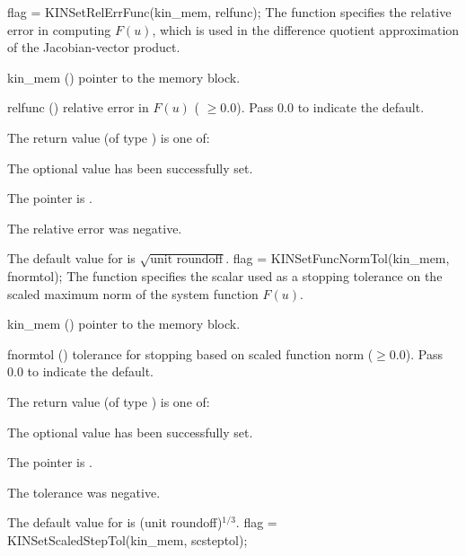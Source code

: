 {
flag = KINSetRelErrFunc(kin\_mem, relfunc);
}
{
  The function  specifies the relative error in 
  computing $F(u)$, which is used in the difference quotient approximation of the
  Jacobian-vector product.
}
{
  \begin{args}[relfunc]
  \item[kin\_mem] ()
    pointer to the {\kinsol} memory block.
  \item[relfunc] ()
    relative error in $F(u)$ ( $\geq 0.0$).  Pass $0.0$ to indicate
    the default.
  \end{args}
}
{
  The return value  (of type ) is one of:
  \begin{args}
  \item[\Id{KIN\_SUCCESS}] 
    The optional value has been successfully set.
  \item[\Id{KIN\_MEM\_NULL}]
    The  pointer is .
  \item[\Id{KIN\_ILL\_INPUT}]
    The relative error was negative.
  \end{args}
}
{
  The default value for  is $\sqrt{\text{unit roundoff}}$.
}
{
flag = KINSetFuncNormTol(kin\_mem, fnormtol);
}
{
  The function  specifies the scalar used as a stopping
  tolerance on the scaled maximum norm of the system function $F(u)$.
}
{
  \begin{args}[fnormtol]
  \item[kin\_mem] ()
    pointer to the {\kinsol} memory block.
  \item[fnormtol] ()
    tolerance for stopping based on scaled function norm ($\geq 0.0$).
    Pass $0.0$ to indicate the default.
  \end{args}
}
{
  The return value  (of type ) is one of:
  \begin{args}
  \item[\Id{KIN\_SUCCESS}] 
    The optional value has been successfully set.
  \item[\Id{KIN\_MEM\_NULL}]
    The  pointer is .
  \item[\Id{KIN\_ILL\_INPUT}]
    The tolerance was negative.
  \end{args}
}
{
  The default value for  is (unit roundoff)$^{1/3}$.
}
{
flag = KINSetScaledStepTol(kin\_mem, scsteptol);
}
